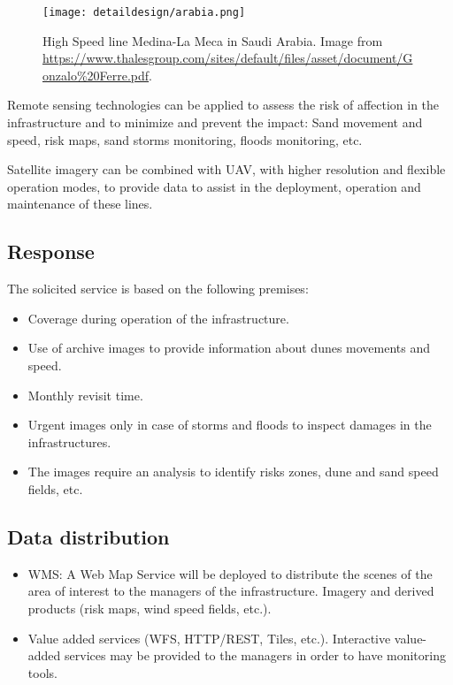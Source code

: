 \begin{figure}[!h]
\begin{center}
\texttt{[image: detaildesign/arabia.png]}
\caption[High Speed line Medina-La Meca in Saudi Arabia]{High Speed line Medina-La Meca in Saudi Arabia. Image from \url{https://www.thalesgroup.com/sites/default/files/asset/document/Gonzalo\%20Ferre.pdf}.}
\label{fig:arabia}
\end{center}
\end{figure}

Remote sensing technologies can be applied to assess the risk of affection in the infrastructure and to minimize and prevent the impact: Sand movement and speed, risk maps, sand storms monitoring, floods monitoring, etc.

Satellite imagery can be combined with \ac{UAV}, with
higher resolution and flexible operation modes, to provide data to assist in the
deployment, operation and maintenance of these lines. 

\subsection{Response}
The solicited service is based on the following premises:
\begin{itemize}
\item Coverage during operation of the infrastructure.
\item Use of archive images to provide information about dunes movements and speed.
\item Monthly revisit time.
\item Urgent images only in case of storms and floods to inspect damages in the infrastructures.
\item The images require an analysis to identify risks zones, dune and sand
  speed fields, etc.
\end{itemize}

\subsection{Data distribution}
\begin{itemize}
\item \ac{WMS}: A Web Map Service will be deployed to distribute the scenes of the area of interest to the managers of the infrastructure. Imagery and derived products (risk maps, wind speed fields, etc.). 
\item Value added services (WFS, HTTP/REST, Tiles, etc.). Interactive value-added services may be provided to the managers in order to have monitoring tools. 
\end{itemize}
